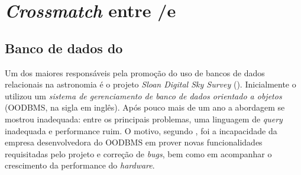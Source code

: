 


\chapter{{\em Crossmatch} entre \SDSS/\STARLIGHT e \galex}
\label{sec:Crossmatch}



\section{Banco de dados do \SDSS}

Um dos maiores responsáveis pela promoção do uso de bancos de dados relacionais
na astronomia é o projeto {\em Sloan Digital Sky Survey} (\SDSS). Inicialmente o
\SDSS utilizou um {\em sistema de gerenciamento de banco de dados orientado a
objetos} \citep{Maier1986} (OODBMS, na sigla em inglês). Após pouco mais de um
ano a abordagem se mostrou inadequada: entre os principais problemas, uma
linguagem de {\em query} inadequada e performance ruim. O motivo, segundo
\citet{Thakar2004}, foi a incapacidade da empresa desenvolvedora do OODBMS em
prover novas funcionalidades requisitadas pelo projeto e correção de {\em bugs},
bem como em acompanhar o crescimento da performance do {\em hardware}.

